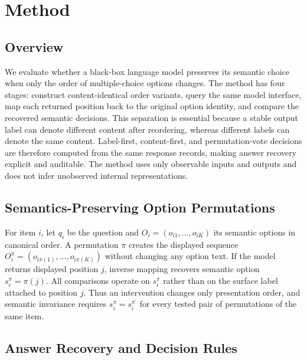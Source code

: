 \section{Method}

\label{sec:method}


\subsection{Overview}

We evaluate whether a black-box language model preserves its semantic choice when only the order of multiple-choice options changes. The method has four stages: construct content-identical order variants, query the same model interface, map each returned position back to the original option identity, and compare the recovered semantic decisions. This separation is essential because a stable output label can denote different content after reordering, whereas different labels can denote the same content. Label-first, content-first, and permutation-vote decisions are therefore computed from the same response records, making answer recovery explicit and auditable. The method uses only observable inputs and outputs and does not infer unobserved internal representations.


\subsection{Semantics-Preserving Option Permutations}

For item $i$, let $q_i$ be the question and $O_i=(o_{i1},\ldots,o_{iK})$ its semantic options in canonical order. A permutation $\pi$ creates the displayed sequence $O_i^{\pi}=(o_{i\pi(1)},\ldots,o_{i\pi(K)})$ without changing any option text. If the model returns displayed position $j$, inverse mapping recovers semantic option $s_i^{\pi}=\pi(j)$. All comparisons operate on $s_i^{\pi}$ rather than on the surface label attached to position $j$. Thus an intervention changes only presentation order, and semantic invariance requires $s_i^{\pi}=s_i^{\pi^{\prime}}$ for every tested pair of permutations of the same item.


\subsection{Answer Recovery and Decision Rules}

